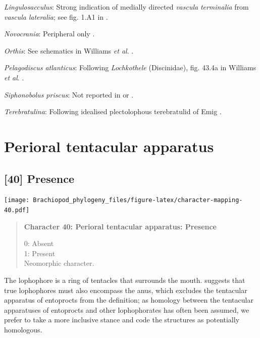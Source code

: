 \documentclass[openany]{book}
\begin{document}
\hypertarget{Lingulosacculus-coding-39}{}
\emph{Lingulosacculus}: Strong indication of medially directed
\emph{vascula} \emph{terminalia} from \emph{vascula} \emph{lateralia};
see fig. 1.A1 in \citet{Balthasar2009EarlyCambrian}.

\hypertarget{Novocrania-coding-39}{}
\emph{Novocrania}: Peripheral only
\citep[p.158]{Williams2000LinguliformeaCraniiformea}.

\hypertarget{Orthis-coding-39}{}
\emph{Orthis}: See schematics in Williams \emph{et al}.
\citeyearpar{Williams2000LinguliformeaCraniiformea}.

\hypertarget{Pelagodiscus_atlanticus-coding-39}{}
\emph{Pelagodiscus atlanticus}: Following \emph{Lochkothele}
(Discinidae), fig. 43.4a in Williams \emph{et al}.
\citeyearpar{Williams2000LinguliformeaCraniiformea}.

\hypertarget{Siphonobolus_priscus-coding-39}{}
\emph{Siphonobolus priscus}: Not reported in
\citet{Havlicek1982LingulaceaPaterinacea} or
\citet{Williams2000LinguliformeaCraniiformea}.

\hypertarget{Terebratulina-coding-39}{}
\emph{Terebratulina}: Following idealised plectolophous terebratulid of
Emig \citeyearpar{Emig1992Functionaldisposition}.

\section{Perioral tentacular
apparatus}\label{perioral-tentacular-apparatus}

\subsection*{{[}40{]} Presence}\label{presence-1}

\texttt{[image: Brachiopod\_phylogeny\_files/figure-latex/character-mapping-40.pdf]}

\begin{quote}
\textbf{Character 40: Perioral tentacular apparatus: Presence}

0: Absent\\
1: Present\\
Neomorphic character.
\end{quote}

The lophophore is a ring of tentacles that surrounds the mouth.
\citet{Temereva2017Innervationof} suggests that true lophophores must
also encompass the anus, which excludes the tentacular apparatus of
entoprocts from the definition; as homology between the tentacular
apparatuses of entoprocts and other lophophorates has often been
assumed, we prefer to take a more inclusive stance and code the
structures as potentially homologous.
\end{document}
